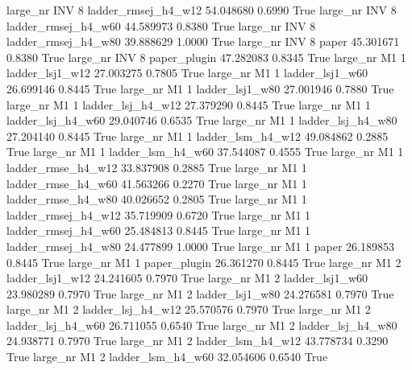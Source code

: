   large_nr      INV                 8 ladder_rmsej_h4_w12   54.048680      0.6990    True
  large_nr      INV                 8 ladder_rmsej_h4_w60   44.589973      0.8380    True
  large_nr      INV                 8 ladder_rmsej_h4_w80   39.888629      1.0000    True
  large_nr      INV                 8               paper   45.301671      0.8380    True
  large_nr      INV                 8        paper_plugin   47.282083      0.8345    True
  large_nr       M1                 1     ladder_lsj1_w12   27.003275      0.7805    True
  large_nr       M1                 1     ladder_lsj1_w60   26.699146      0.8445    True
  large_nr       M1                 1     ladder_lsj1_w80   27.001946      0.7880    True
  large_nr       M1                 1   ladder_lsj_h4_w12   27.379290      0.8445    True
  large_nr       M1                 1   ladder_lsj_h4_w60   29.040746      0.6535    True
  large_nr       M1                 1   ladder_lsj_h4_w80   27.204140      0.8445    True
  large_nr       M1                 1   ladder_lsm_h4_w12   49.084862      0.2885    True
  large_nr       M1                 1   ladder_lsm_h4_w60   37.544087      0.4555    True
  large_nr       M1                 1  ladder_rmse_h4_w12   33.837908      0.2885    True
  large_nr       M1                 1  ladder_rmse_h4_w60   41.563266      0.2270    True
  large_nr       M1                 1  ladder_rmse_h4_w80   40.026652      0.2805    True
  large_nr       M1                 1 ladder_rmsej_h4_w12   35.719909      0.6720    True
  large_nr       M1                 1 ladder_rmsej_h4_w60   25.484813      0.8445    True
  large_nr       M1                 1 ladder_rmsej_h4_w80   24.477899      1.0000    True
  large_nr       M1                 1               paper   26.189853      0.8445    True
  large_nr       M1                 1        paper_plugin   26.361270      0.8445    True
  large_nr       M1                 2     ladder_lsj1_w12   24.241605      0.7970    True
  large_nr       M1                 2     ladder_lsj1_w60   23.980289      0.7970    True
  large_nr       M1                 2     ladder_lsj1_w80   24.276581      0.7970    True
  large_nr       M1                 2   ladder_lsj_h4_w12   25.570576      0.7970    True
  large_nr       M1                 2   ladder_lsj_h4_w60   26.711055      0.6540    True
  large_nr       M1                 2   ladder_lsj_h4_w80   24.938771      0.7970    True
  large_nr       M1                 2   ladder_lsm_h4_w12   43.778734      0.3290    True
  large_nr       M1                 2   ladder_lsm_h4_w60   32.054606      0.6540    True
